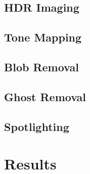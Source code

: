 \documentclass[11pt]{article}
\begin{document}
\subsection{HDR Imaging}

\subsection{Tone Mapping}

\subsection{Blob Removal}

\subsection{Ghost Removal}

\subsection{Spotlighting}


\section{Results}
\end{document}

